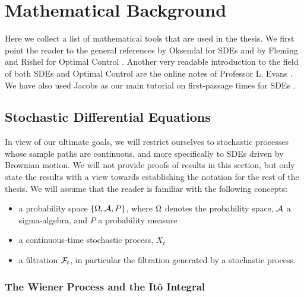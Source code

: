 \chapter{Mathematical Background}
\label{ch:math_background}

Here we collect a list of mathematical tools that are used in the thesis. We
first point the reader to the general references by Oksendal for SDEs
\cite{Oksendal2007} and by Fleming and Rishel for Optimal Control
\cite{Fleming1975}. Another very readable introduction to the field of both SDEs
and Optimal Control are the online notes of Professor L. Evans
\cite{Evansa,Evansb}. We have also used Jacobs as our main tutorial on
first-passage times for SDEs \cite{Jacobs}.
 
\section{Stochastic Differential Equations}
\label{sec:SDEs}
In view of our ultimate goals, we will restrict ourselves to  stochastic
processes whose sample paths are continuous, and more specifically to SDEs
driven by Brownian motion. We will not provide proofs of results in this
section, but only state the results with a view towards establishing the
notation for the rest of the thesis. We will assume that the reader is familiar
with the following concepts:
\begin{itemize} 
  \item a probability space $\{{\Omega}, { \mathcal{A} }, P\}$, where ${\Omega}$ denotes the probability space, ${ \mathcal{A} }$ a sigma-algebra, and $P$ a probability measure
  \item a continuous-time stochastic process, $X_t$
  \item a filtration ${\mathcal{F}}_t$, in particular the filtration generated by a
  stochastic process.
\end{itemize}

\subsection{The Wiener Process and the It\^o Integral}


